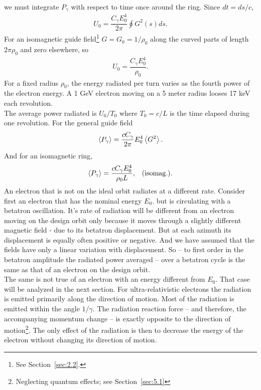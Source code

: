  we must integrate $P_\gamma$ with respect to time once around the ring. Since $dt = ds/c$,
\begin{align}
	U_0 = \dfrac{C_\gamma E_0^4}{2 \pi} \oint G^2(s) ds.
\end{align}
For an isomagnetic guide field\footnote{See Section~\ref{sec:2.2}.} $G = G_0 = 1/\rho_0$ along the curved parts of length $2 \pi \rho_0$ and zero elsewhere, so
\begin{align} \label{eq:4.8}
	U_0 = \dfrac{C_\gamma E_0^4}{\rho_0}.
\end{align}
For a fixed radius $\rho_0$, the energy radiated per turn varies as the fourth power of the electron energy. A 1 GeV electron moving on a 5 meter radius looses 17 keV each revolution.\\
The average power radiated is $U_0/T_0$ where $T_0= c/L$ is the time elapsed during one revolution. For the general guide field
\begin{align} \label{eq:4.9}
	\left< P_\gamma \right> = \dfrac{cC_\gamma}{2\pi} E_0^4 \left< G^2 \right>.
\end{align}
And for an isomagnetic ring,
\begin{align} \label{eq:4.10}
	\left< P_\gamma \right> = \dfrac{c C_\gamma E_0^4}{\rho_0 L}, && \text{(isomag.).}
\end{align}
An electron that is not on the ideal orbit radiates at a different rate. Consider first an electron that has the nominal energy $E_0$. but is circulating with a betatron oscillation. It's rate of radiation will be different from an electron moving on the design orbit only because it moves through a slightly different magnetic field - due to its betatron displacement. But at each azimuth its displacement is equally often positive or negative. And we have assumed that the fields have only a linear variation with displacement. So -- to first order in the betatron amplitude the radiated power averaged -- over a betatron cycle is the same as that of an electron on the design orbit.\\
The same is not true of an electron with an energy different from $E_0$. That
case will be analyzed in the next section.
For ultra-relativistic electrons the radiation is emitted primarily along the direction of motion. Most of the radiation is emitted within the angle $1/\gamma$. The radiation reaction force -- and therefore, the accompanying momentum change -- is exactly opposite to the direction
 of motion\footnote{Neglecting quantum effects; see Section~\ref{sec:5.1}}. The only effect of the radiation is then to decrease the energy of the electron without changing its direction
 of motion.




